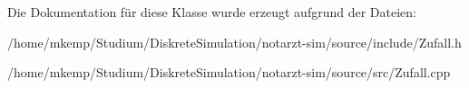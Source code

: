 Die Dokumentation für diese Klasse wurde erzeugt aufgrund der Dateien\+:\begin{DoxyCompactItemize}
\item 
/home/mkemp/\+Studium/\+Diskrete\+Simulation/notarzt-\/sim/source/include/Zufall.\+h\item 
/home/mkemp/\+Studium/\+Diskrete\+Simulation/notarzt-\/sim/source/src/Zufall.\+cpp\end{DoxyCompactItemize}
